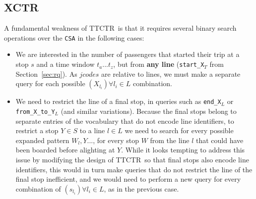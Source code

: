 \documentclass[runningheads]{llncs}
\newcommand{\ctr}{XCTR}
\newcommand{\ttctr}{TTCTR}
\begin{document}
\subsection{\ctr}
\label{sec:ctr}
A fundamental weakness of \ttctr~is that it requires several binary search operations over the \texttt{CSA} in the following cases:
\begin{itemize}
    \item We are interested in the number of passengers that started their trip at a stop $s$ and a time window $t_a...t_z$, but from \textbf{any line} (\texttt{start\_X$_{T}$} from Section~\ref{sec:rq}). As $jcodes$ are relative to lines, we must make a separate query for each possible $(X_{l_i}) \forall l_i \in L$ combination.
    \item We need to restrict the line of a final stop, in queries such as \texttt{end\_X$_{L}$} or \texttt{from\_X\_to\_Y$_{L}$} (and similar variations). Because the final stops belong to separate entries of the vocabulary that do not encode line identifiers, to restrict a stop $Y\in S$ to a line $l\in L$ we need to search for every possible expanded pattern $W_l,Y...$, for every stop $W$ from the line $l$ that could have been boarded before alighting at $Y$. While it looks tempting to address this issue by modifying the design of \ttctr~so that final stops also encode line identifiers, this would in turn make queries that do not restrict the line of the final stop inefficient, and we would need to perform a new query for every combination of $(s_{l_i}) \forall l_i \in L$, as in the previous case. 
\end{itemize}
\end{document}
